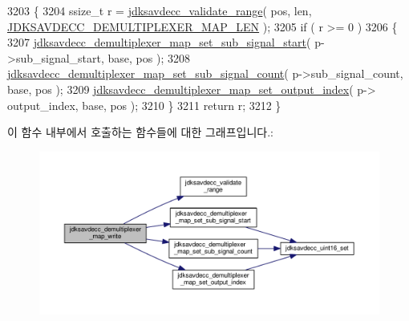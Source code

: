 \begin{DoxyCode}
3203 \{
3204     ssize\_t r = \hyperlink{group__util_ga9c02bdfe76c69163647c3196db7a73a1}{jdksavdecc\_validate\_range}( pos, len, 
      \hyperlink{group__demultiplexer__map_ga8b3c020525226264283bd200ab36296e}{JDKSAVDECC\_DEMULTIPLEXER\_MAP\_LEN} );
3205     \textcolor{keywordflow}{if} ( r >= 0 )
3206     \{
3207         \hyperlink{group__demultiplexer__map_ga31252ba4bc4b0624e0c4a9a4d349cccb}{jdksavdecc\_demultiplexer\_map\_set\_sub\_signal\_start}(
       p->sub\_signal\_start, base, pos );
3208         \hyperlink{group__demultiplexer__map_ga9946190d8c02ce5b5a74cafffa57af81}{jdksavdecc\_demultiplexer\_map\_set\_sub\_signal\_count}(
       p->sub\_signal\_count, base, pos );
3209         \hyperlink{group__demultiplexer__map_gadd33cdf074089b5421b0a3ef1d4656cb}{jdksavdecc\_demultiplexer\_map\_set\_output\_index}( p->
      output\_index, base, pos );
3210     \}
3211     \textcolor{keywordflow}{return} r;
3212 \}
\end{DoxyCode}


이 함수 내부에서 호출하는 함수들에 대한 그래프입니다.\+:
\nopagebreak
\begin{figure}[H]
\begin{center}
\leavevmode
\includegraphics[width=350pt]{group__demultiplexer__map_ga6aa945f9a3dabf8c5eab61670f7c4f12_cgraph}
\end{center}
\end{figure}


